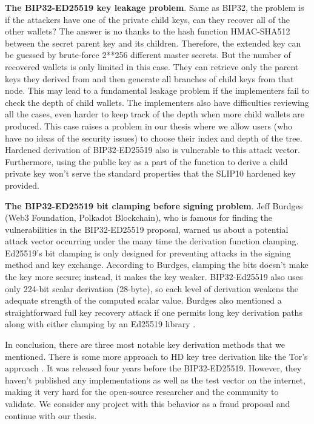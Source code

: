 \bigskip
{\textbf{The BIP32-ED25519 key leakage problem}}. Same as BIP32, the problem is if the attackers have one of the private child keys, can they recover all of the other wallets? The answer is no thanks to the hash function HMAC-SHA512 between the secret parent key and its children. Therefore, the extended key can be guessed by brute-force 2**256 different master secrets. But the number of recovered wallets is only limited in this case. They can retrieve only the parent keys they derived from and then generate all branches of child keys from that node. This may lead to a fundamental leakage problem if the implementers fail to check the depth of child wallets. The implementers also have difficulties reviewing all the cases, even harder to keep track of the depth when more child wallets are produced. This case raises a problem in our thesis where we allow users (who have no ideas of the security issues) to choose their index and depth of the tree. Hardened derivation of BIP32-ED25519 also is vulnerable to this attack vector. Furthermore, using the public key as a part of the function to derive a child private key won’t serve the standard properties that the SLIP10 hardened key provided.

\bigskip
{\textbf{The BIP32-ED25519 bit clamping before signing problem}}. Jeff Burdges (Web3 Foundation, Polkadot Blockchain), who is famous for finding the vulnerabilities in the BIP32-ED25519 proposal, warned us about a potential attack vector occurring under the many time the derivation function clamping. Ed25519’s bit clamping is only designed for preventing attacks in the signing method and key exchange. According to Burdges, clamping the bits doesn’t make the key more secure; instead, it makes the key weaker. BIP32-Ed25519 also uses only 224-bit scalar derivation (28-byte), so each level of derivation weakens the adequate strength of the computed scalar value.
Burdges also mentioned a straightforward full key recovery attack if one permits long key derivation paths along with either clamping by an Ed25519 library \cite{Jeff}.

In conclusion, there are three most notable key derivation methods that we mentioned. There is some more approach to HD key tree derivation like the Tor’s approach \cite{torspec}. It was released four years before the BIP32-ED25519. However, they haven’t published any implementations as well as the test vector on the internet, making it very hard for the open-source researcher and the community to validate. We consider any project with this behavior as a fraud proposal and continue with our thesis.

